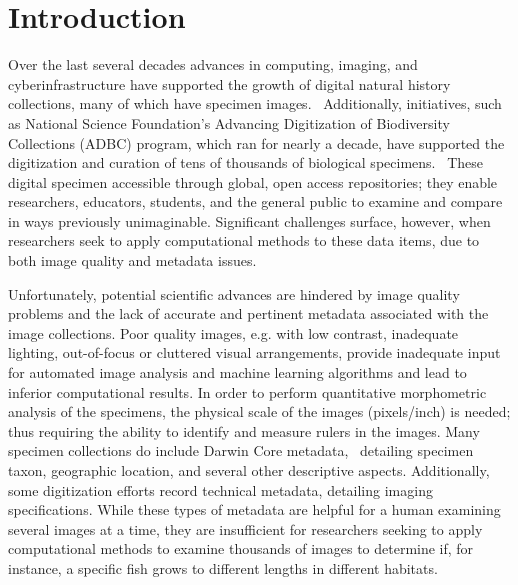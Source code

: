 \documentclass[conference]{IEEEtran}
\begin{document}
\section{Introduction}
Over the last several decades advances in computing, imaging, and cyberinfrastructure have supported the growth of digital natural history collections, many of which have specimen images.~\cite{beaman2012mass} Additionally, initiatives, such as National Science Foundation’s Advancing Digitization of Biodiversity Collections (ADBC) program, which ran for nearly a decade, have supported the digitization and curation of tens of thousands of biological specimens.~\cite{page2015digitization} These digital specimen accessible through global, open access repositories; they enable researchers, educators, students, and the general public to examine and compare in ways previously unimaginable. Significant challenges surface, however, when researchers seek to apply computational methods to these data items, due to both image quality and metadata issues.

Unfortunately, potential scientific advances are hindered by image quality
problems and the lack of accurate and pertinent metadata
associated with the image collections.
Poor quality images, e.g. with low contrast, inadequate lighting,
out-of-focus or cluttered visual arrangements, provide inadequate input
for automated
image analysis and machine learning algorithms and lead to inferior
computational results.
In order to perform quantitative morphometric analysis of the specimens,
the physical scale of the images (pixels/inch) is needed; thus
requiring the ability to identify and measure rulers in the images.
Many specimen collections do include Darwin Core metadata,~\cite{biodiv_info_standards} detailing
specimen taxon, geographic location, and several other descriptive aspects.
Additionally, some digitization efforts record technical metadata, detailing imaging specifications. While these types of metadata are helpful for a
human examining several images at a time, they are insufficient for researchers seeking to apply computational methods to examine thousands of images
to determine if, for instance, a specific fish grows to different lengths
in different habitats.
\end{document}
